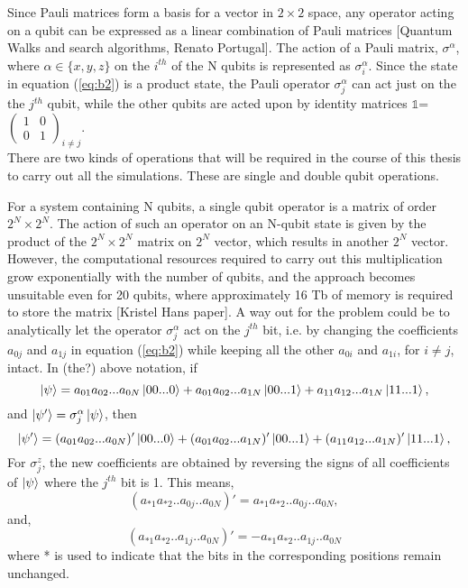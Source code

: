\documentclass[12]{article}
\begin{document}
Since Pauli matrices form a basis for a vector in $2 \times 2$ space, any operator acting on a qubit can be expressed as a linear combination of Pauli matrices [Quantum Walks and search algorithms, Renato Portugal]. The action of a Pauli matrix, $\sigma^\alpha$, where $\alpha \in \{x,y,z\}$ on the $i^{th}$ of the N qubits is represented as $\sigma_i^\alpha$. Since the state in equation (\ref{eq:b2}) is a product state, the Pauli operator $\sigma_j^\alpha$ can act just on the the $j^{th}$ qubit, while the other qubits are acted upon by identity matrices $\mathbb{1}$=$\begin{pmatrix}
1&0\\
0&1
\end{pmatrix}_{i \neq j}
$.\\

There are two kinds of operations that will be required in the course of this thesis to carry out all the simulations. These are single and double qubit operations. 


For a system containing N qubits, a single qubit operator is a matrix of order $2^N \times 2^N$. The action of such an operator on an N-qubit state is given by the product of the $2^N \times 2^N$ matrix on $2^N$ vector, which results in another  $2^N$ vector. However, the computational resources required to carry out this multiplication grow exponentially with the number of qubits, and the approach becomes unsuitable even for 20 qubits, where approximately 16 Tb of memory is required to store the matrix [Kristel Hans paper]. A way out for the problem could be to analytically let the operator $\sigma_j^\alpha$ act on the $j^{th}$ bit, i.e. by changing the coefficients $a_{0j}$ and $a_{1j}$ in equation (\ref{eq:b2}) while keeping all the other $a_{0i}$ and $a_{1i}$, for $i \neq j$, intact. In (the?) above notation, if
\begin{equation}
\ket{\psi}= a_{01}a_{02}...a_{0N}\ket{00...0}+a_{01}a_{02}...a_{1N}\ket{00...1}+a_{11}a_{12}...a_{1N}\ket{11...1},
\end{equation}
and $\ket{\psi'}=\sigma_j^\alpha \ket{\psi}$, then
\begin{equation}
\ket{\psi'}= (a_{01}a_{02}...a_{0N})'\ket{00...0}+(a_{01}a_{02}...a_{1N})'\ket{00...1}+(a_{11}a_{12}...a_{1N})'\ket{11...1},
\end{equation}
For $\sigma_j^z$, the new coefficients are obtained by reversing the signs of all coefficients of $\ket{\psi}$ where the $j^{th}$ bit is 1. This means, 
\begin{equation}
(a_{*1}a_{*2}..a_{0j}..a_{0N})'=a_{*1}a_{*2}..a_{0j}..a_{0N},
\end{equation}
and,
\begin{equation}
(a_{*1}a_{*2}..a_{1j}..a_{0N})'=-a_{*1}a_{*2}..a_{1j}..a_{0N}
\end{equation}
where * is used to indicate that the bits in the corresponding positions remain unchanged.
\end{document}
